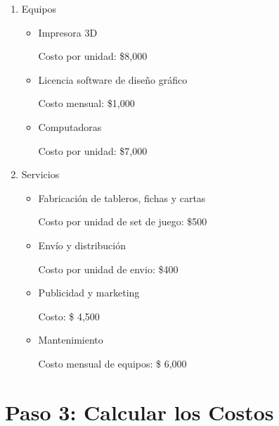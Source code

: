 \documentclass[12pt]{article}
\begin{document}
\begin{enumerate}
	\item Equipos

	\begin{itemize}
		\item Impresora 3D

		Costo por unidad: \$8,000

		\item Licencia software de diseño gráfico

		Costo mensual: \$1,000

		\item Computadoras

		Costo por unidad: \$7,000

	\end{itemize}

	\item Servicios

	\begin{itemize}
		\item Fabricación de tableros, fichas y cartas

		Costo por unidad de set de juego: \$500

		\item Envío y distribución

		Costo por unidad de envio: \$400

		\item Publicidad y marketing

		Costo: \$ 4,500

		\item Mantenimiento

		Costo mensual de equipos: \$ 6,000
	\end{itemize}





\end{enumerate}



 \section*{Paso 3: Calcular los Costos}
\end{document}
